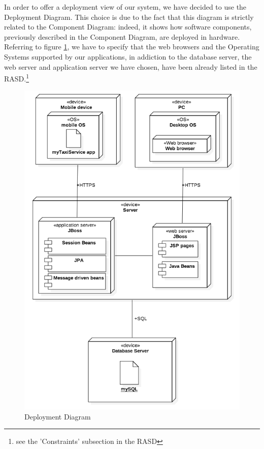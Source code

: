 In order to offer a deployment view of our system, we have decided to use the Deployment Diagram. This choice is due to the fact that this diagram is strictly related to the Component Diagram: indeed, it shows how software components, previously described in the Component Diagram, are deployed in hardware. 
\newline
Referring to figure \ref{fig:deployment-diagram}, we have to specify that the web browsers and the Operating Systems supported by our applications, in addiction to the database server, the web server and application server we have chosen, have been already listed in the RASD.\footnote{see the 'Constraints' subsection in the RASD}

\begin{figure}[H]
            \centering
            \includegraphics[width=12cm]{./Images/DeploymentDiagram.png}
            \caption{Deployment Diagram}
            \label{fig:deployment-diagram}
\end{figure}
